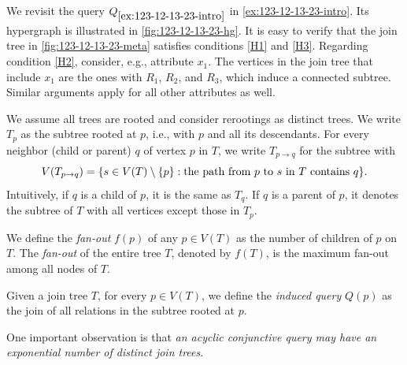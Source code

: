 \begin{example}
    We revisit the query $Q_{\ref{ex:123-12-13-23-intro}}$ in \cref{ex:123-12-13-23-intro}. Its hypergraph is illustrated in \cref{fig:123-12-13-23-hg}. It is easy to verify that the join tree in \cref{fig:123-12-13-23-meta} satisfies conditions \ref{H1} and \ref{H3}. Regarding condition \ref{H2}, consider, e.g., attribute \( x_1 \). The vertices in the join tree that include \( x_1 \) are the ones with \( R_1 \), \( R_2 \), and \( R_3 \), which induce a connected subtree. Similar arguments apply for all other attributes as well.
\end{example}

We assume all trees are rooted and consider rerootings as distinct trees.
We write $T_p$ as the subtree rooted at $p$, i.e., with $p$ and all its descendants. For every neighbor (child or parent) $q$ of vertex $p$ in $T$, we write $T_{p \to q}$ for the subtree with
\[
    V( T_{p \to q} ) = 
    \lbrace s \in V(T) \setminus \{ p \} : \text{the path from } p \text{ to } s \text{ in } T \text{ contains } q \rbrace\text.
\]
Intuitively, if $q$ is a child of $p$, it is the same as $T_q$. If $q$ is a parent of $p$, it denotes the subtree of $T$ with all vertices except those in $T_p$.

We define the \emph{fan-out} $f(p)$ of any $p \in V(T)$ as 
the number of children of $p$ on $T$.  The \emph{fan-out} of the entire tree $T$, denoted by $f(T)$, is the maximum fan-out among all nodes of $T$.

Given a join tree $T$, for every $p \in V(T)$, we define the \emph{induced query} $Q(p)$ as the join of all relations in the subtree rooted at $p$. 

One important observation is that \emph{an acyclic conjunctive query may have an exponential number of distinct join trees}.

